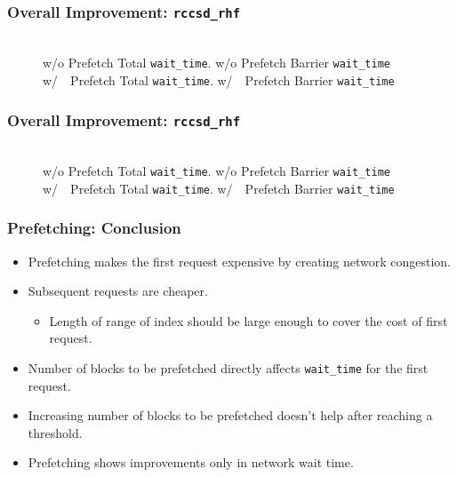 \documentclass{beamer}
\begin{document}
\begin{frame}[fragile]
  \frametitle{Overall Improvement: \texttt{rccsd\_rhf}}
  \fontsize{7pt}{7.2}\selectfont
  \begin{figure}[h]
    \resizebox{.9\linewidth}{!}{}
    \\
     w/o Prefetch Total \texttt{wait\_time}.
     w/o Prefetch Barrier \texttt{wait\_time}
    \\
     w/~~Prefetch Total \texttt{wait\_time}.
      w/~~Prefetch Barrier \texttt{wait\_time}
  \end{figure}
\end{frame}

\begin{frame}[fragile]
  \frametitle{Overall Improvement: \texttt{rccsd\_rhf}}
  \fontsize{7pt}{7.2}\selectfont
  \begin{figure}[h]
    \resizebox{.9\linewidth}{!}{}
    \\
     w/o Prefetch Total \texttt{wait\_time}.
     w/o Prefetch Barrier \texttt{wait\_time}
    \\
     w/~~Prefetch Total \texttt{wait\_time}.
      w/~~Prefetch Barrier \texttt{wait\_time}
  \end{figure}
\end{frame}

\begin{frame}[fragile]
  \frametitle{Prefetching: Conclusion}
  \begin{itemize}
  \item<2-4> Prefetching makes the first request expensive by creating network congestion.
  \item<3-4> Subsequent requests are cheaper.
    \begin{itemize}
    \item<4-4> Length of range of index should be large enough to cover the cost of
      first request.
    \end{itemize}
  \item<5-> Number of blocks to be prefetched directly affects \texttt{wait\_time} for the
    first request.
  \item<6-> Increasing number of blocks to be prefetched doesn't help after reaching a threshold.
  \item<7-> Prefetching shows improvements only in network wait time.
  \end{itemize}
\end{frame}
\end{document}
